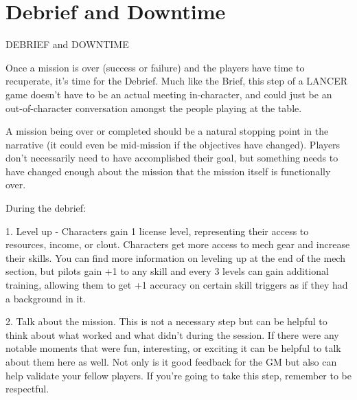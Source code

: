 \chapter{Debrief and Downtime}

                      DEBRIEF and DOWNTIME


Once a mission is over (success or failure) and the players have time to recuperate, it’s time for
the Debrief. Much like the Brief, this step of a LANCER game doesn’t have to be an actual
meeting in-character, and could just be an out-of-character conversation amongst the people
playing at the table.


A mission being over or completed should be a natural stopping point in the narrative (it could
even be mid-mission if the objectives have changed). Players don’t necessarily need to have
accomplished their goal, but something needs to have changed enough about the mission that
the mission itself is functionally over.


During the debrief:

	        1. Level up - Characters gain 1 license level, representing their access to resources,
income, or clout. Characters get more access to mech gear and increase their skills. You can find
more information on leveling up at the end of the mech section, but pilots gain +1 to any skill and
every 3 levels can gain additional training, allowing them to get +1 accuracy on certain skill
triggers as if they had a background in it.

	        2. Talk about the mission. This is not a necessary step but can be helpful to think about
what worked and what didn’t during the session. If there were any notable moments that were
fun, interesting, or exciting it can be helpful to talk about them here as well. Not only is it good
feedback for the GM but also can help validate your fellow players. If you’re going to take this
step, remember to be respectful.


